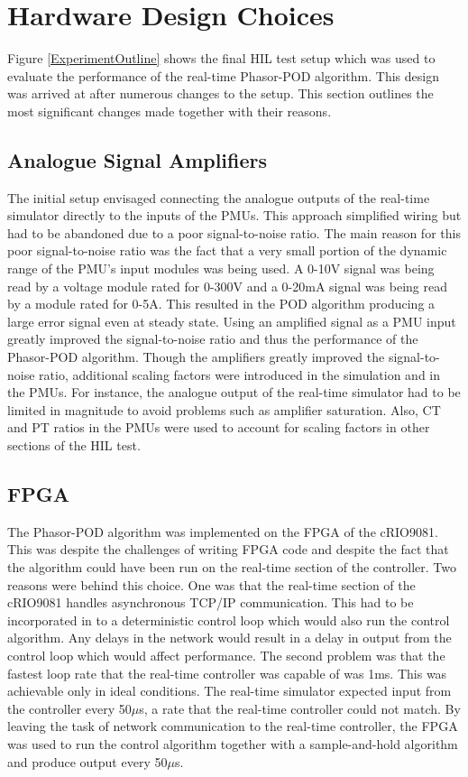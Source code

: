 \documentclass[conference]{IEEEtran}
\begin{document}
\section{Hardware Design Choices} \label{Design}
Figure \ref{ExperimentOutline} shows the final HIL test setup which was used to evaluate the performance of the real-time Phasor-POD algorithm. This design was arrived at after numerous changes to the setup. This section outlines the most significant changes made together with their reasons.

\subsection{Analogue Signal Amplifiers} The initial setup envisaged connecting the analogue outputs of the real-time simulator directly to the inputs of the PMUs. This approach simplified wiring but had to be abandoned due to a poor signal-to-noise ratio. The main reason for this poor signal-to-noise ratio was the fact that a very small portion of the dynamic range of the PMU's input modules was being used. A 0-10V signal was being read by a voltage module rated for 0-300V and a 0-20mA signal was being read by a module rated for 0-5A. This resulted in the POD algorithm producing a large error signal even at steady state. Using an amplified signal as a PMU input greatly improved the signal-to-noise ratio and thus the performance of the Phasor-POD algorithm. Though the amplifiers greatly improved the signal-to-noise ratio, additional scaling factors were introduced in the simulation and in the PMUs. For instance, the analogue output of the real-time simulator had to be limited in magnitude to avoid problems such as amplifier saturation. Also, CT and PT ratios in the PMUs were used to account for scaling factors in other sections of the HIL test.

\subsection{FPGA} The Phasor-POD algorithm was implemented on the FPGA of the cRIO9081. This was despite the challenges of writing FPGA code and despite the fact that the algorithm could have been run on the real-time section of the controller. Two reasons were behind this choice. One was that the real-time section of the cRIO9081 handles asynchronous TCP/IP communication. This had to be incorporated in to a deterministic control loop which would also run the control algorithm. Any delays in the network would result in a delay in output from the control loop which would affect performance. The second problem was that the fastest loop rate that the real-time controller was capable of was 1ms. This was achievable only in ideal conditions. The real-time simulator expected input from the controller every 50$\mu$s, a rate that the real-time controller could not match. By leaving the task of network communication to the real-time controller, the FPGA was used to run the control algorithm together with a sample-and-hold algorithm and produce output every 50$\mu$s.
\end{document}
